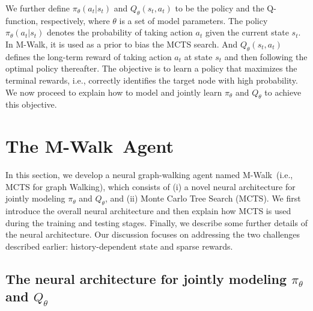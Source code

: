 \documentclass{article}
\newcommand{\modelname}{M-Walk}
\begin{document}
    We further define $\pi_{\theta}(a_t|s_t)$ and $Q_{\theta}(s_t, a_t)$ to be the policy and the Q-function, respectively, where $\theta$ is a set of model parameters. The policy $\pi_{\theta}(a_t|s_t)$ denotes the probability of taking action $a_t$ given the current state $s_t$. In \modelname, it is used as a prior to bias the MCTS search. And $Q_{\theta}(s_t,a_t)$ defines the long-term reward of taking action $a_t$ at state $s_t$ and then following the optimal policy thereafter. The objective is to learn a policy that maximizes the terminal rewards, i.e., correctly identifies the target node with high probability. We now proceed to explain how to model and jointly learn $\pi_{\theta}$ and $Q_{\theta}$ to achieve this objective.


	
\section{The \modelname~Agent}
\label{Sec:\modelname}
	
	In this section, we develop a neural graph-walking agent named \modelname~(i.e., MCTS for graph Walking), which consists of (i) a novel neural architecture for jointly modeling $\pi_{\theta}$ and $Q_{\theta}$, and (ii) Monte Carlo Tree Search (MCTS). We first introduce the overall neural architecture and then explain how MCTS is used during the training and testing stages. Finally, we describe some further details of the neural architecture. Our discussion focuses on addressing the two challenges described earlier: history-dependent state and sparse rewards.
	
\subsection{The neural architecture for jointly modeling $\pi_{\theta}$ and $Q_{\theta}$}
\label{Sec:\modelname:Model}
	
\end{document}
